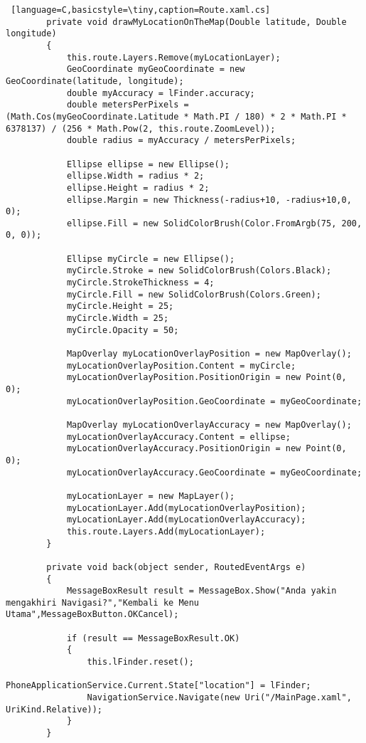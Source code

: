 \begin{lstlisting} [language=C,basicstyle=\tiny,caption=Route.xaml.cs]
        private void drawMyLocationOnTheMap(Double latitude, Double longitude)
        {
            this.route.Layers.Remove(myLocationLayer);
            GeoCoordinate myGeoCoordinate = new GeoCoordinate(latitude, longitude);
            double myAccuracy = lFinder.accuracy; 
            double metersPerPixels = (Math.Cos(myGeoCoordinate.Latitude * Math.PI / 180) * 2 * Math.PI * 6378137) / (256 * Math.Pow(2, this.route.ZoomLevel));
            double radius = myAccuracy / metersPerPixels;

            Ellipse ellipse = new Ellipse();
            ellipse.Width = radius * 2;
            ellipse.Height = radius * 2;
            ellipse.Margin = new Thickness(-radius+10, -radius+10,0, 0);
            ellipse.Fill = new SolidColorBrush(Color.FromArgb(75, 200, 0, 0));

            Ellipse myCircle = new Ellipse();
            myCircle.Stroke = new SolidColorBrush(Colors.Black);
            myCircle.StrokeThickness = 4;
            myCircle.Fill = new SolidColorBrush(Colors.Green);
            myCircle.Height = 25;
            myCircle.Width = 25;
            myCircle.Opacity = 50;

            MapOverlay myLocationOverlayPosition = new MapOverlay();
            myLocationOverlayPosition.Content = myCircle;
            myLocationOverlayPosition.PositionOrigin = new Point(0, 0);
            myLocationOverlayPosition.GeoCoordinate = myGeoCoordinate;

            MapOverlay myLocationOverlayAccuracy = new MapOverlay();
            myLocationOverlayAccuracy.Content = ellipse;
            myLocationOverlayAccuracy.PositionOrigin = new Point(0, 0);
            myLocationOverlayAccuracy.GeoCoordinate = myGeoCoordinate;

            myLocationLayer = new MapLayer();
            myLocationLayer.Add(myLocationOverlayPosition);
            myLocationLayer.Add(myLocationOverlayAccuracy);
            this.route.Layers.Add(myLocationLayer);
        }

        private void back(object sender, RoutedEventArgs e)
        {
            MessageBoxResult result = MessageBox.Show("Anda yakin mengakhiri Navigasi?","Kembali ke Menu Utama",MessageBoxButton.OKCancel);

            if (result == MessageBoxResult.OK)
            {
                this.lFinder.reset();
								PhoneApplicationService.Current.State["location"] = lFinder;
                NavigationService.Navigate(new Uri("/MainPage.xaml", UriKind.Relative));
            }
        }


\end{lstlisting}
